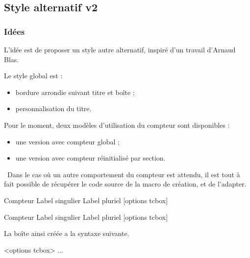 \documentclass[french,11pt,a4paper]{article}
\begin{document}
\subsection{Style alternatif v2}

\subsubsection{Idées}

L'idée est de proposer un style autre alternatif, inspiré d'un travail d'\textsf{Arnaud Blas}.

Le style global est :

\begin{itemize}
  \item bordure arrondie suivant titre et boîte ;
  \item personnalisation du titre.
\end{itemize}

Pour le moment, deux modèles d'utilisation du compteur sont disponibles :

\begin{itemize}
  \item une version avec compteur global ;
  \item une version avec compteur réinitialisé par section.
\end{itemize}

{\footnotesize \faBomb}~Dans le cas où un autre comportement du compteur est attendu, il est tout à fait possible de récupérer le code source de la macro de création, et de l'adapter.

\begin{codehigh}[language=latex/latex2,style/main=cyan!10,style/code=cyan!10]
%
  {Compteur}%
  {Label singulier}
  {Label pluriel}
  [options tcbox]

%
  {Compteur}%
  {Label singulier}
  {Label pluriel}
  [options tcbox]
\end{codehigh}

La boîte ainsi créée a la syntaxe suivante.

\begin{codehigh}[language=latex/latex2,style/main=cyan!10,style/code=cyan!10]
\begin{monenvt}[clés]<options tcbox>
  ...
\end{monenvt}

\end{codehigh}
\end{document}
